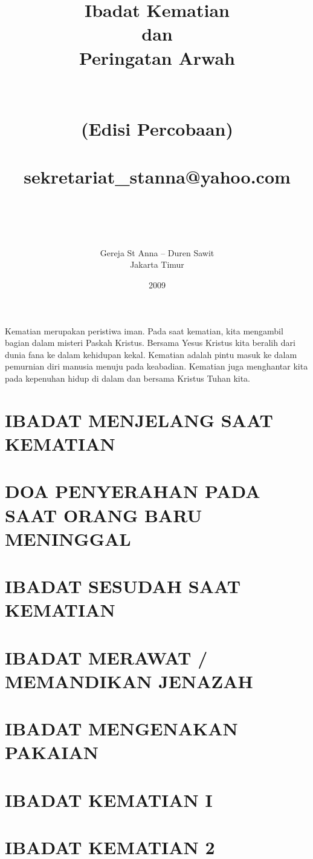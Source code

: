 \documentclass[10pt,a5paper,openany,fancyhdr]{memoir}
\author{Gereja St Anna -- Duren Sawit \\  
Jakarta Timur}
\title{Ibadat Kematian\\ 
dan \\
Peringatan Arwah \\
{~}\\
\vspace{2cm}
~\\
(Edisi Percobaan) \\
~\\
sekretariat\_stanna@yahoo.com \\
~\\
~\\
}
\date{2009}
\begin{document}
\pagestyle{Ruled}
\begin{titlingpage}
\maketitle
\end{titlingpage}

Kematian merupakan peristiwa iman. Pada saat kematian, kita mengambil 
bagian dalam misteri Paskah Kristus. Bersama Yesus Kristus kita beralih 
dari dunia fana ke dalam kehidupan kekal. Kematian adalah pintu masuk ke 
dalam pemurnian diri manusia menuju pada keabadian. Kematian juga 
menghantar kita pada kepenuhan hidup di dalam dan bersama Kristus 
Tuhan kita. 

 



\renewcommand{\cftchapterfont}{\normalfont\rmfamily}   
\renewcommand{\cftsectionfont}{\normalfont\rmfamily}   
\newpage
\tableofcontents



\chapter{IBADAT MENJELANG SAAT KEMATIAN}


\chapter{DOA PENYERAHAN PADA SAAT ORANG BARU MENINGGAL}


\chapter{IBADAT SESUDAH SAAT KEMATIAN} 


\chapter{IBADAT MERAWAT / MEMANDIKAN JENAZAH} 


\chapter{IBADAT MENGENAKAN PAKAIAN} 


\chapter{IBADAT KEMATIAN I}


\chapter{IBADAT KEMATIAN 2} 

\end{document}
